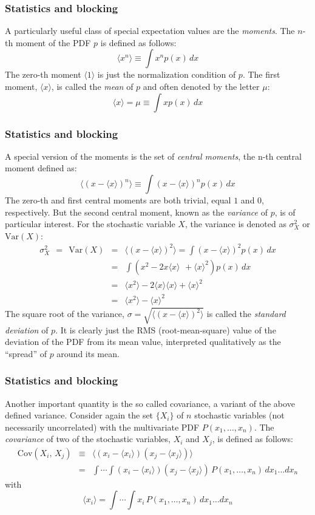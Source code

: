 \documentclass[compress]{beamer}
\newcommand{\bea}{\begin{eqnarray}}
\newcommand{\beaN}{\begin{eqnarray*}}
\newcommand{\eea}{\end{eqnarray}}
\newcommand{\eeaN}{\end{eqnarray*}}
\newcommand{\bdm}{\begin{displaymath}}
\newcommand{\edm}{\end{displaymath}}
\newcommand{\mean}[1]{\langle #1 \rangle}
\newcommand{\meanb}[1]{\big\langle #1 \big\rangle}
\newcommand{\cov}[0]{\mathrm{Cov}}   %
\newcommand{\var}[0]{\mathrm{Var}}   %
\begin{document}
\frame
{
  \frametitle{Statistics and blocking}
\begin{small}
{\scriptsize
A particularly useful class of special expectation values are the
\emph{moments}. The $n$-th moment of the PDF $p$ is defined as
follows:
\bdm
\mean{x^n} \equiv \int\! x^n p(x)\,dx
\edm
The zero-th moment $\mean{1}$ is just the normalization condition of
$p$. The first moment, $\mean{x}$, is called the \emph{mean} of $p$
and often denoted by the letter $\mu$:
\bdm
\mean{x} = \mu \equiv \int\! x p(x)\,dx
\edm
}
\end{small}
}

\frame
{
  \frametitle{Statistics and blocking}
\begin{small}
{\scriptsize
A special version of the moments is the set of \emph{central moments},
the n-th central moment defined as:
\bdm
\mean{(x-\mean{x})^n} \equiv \int\! (x-\mean{x})^n p(x)\,dx
\edm
The zero-th and first central moments are both trivial, equal $1$ and
$0$, respectively. But the second central moment, known as the
\emph{variance} of $p$, is of particular interest. For the stochastic
variable $X$, the variance is denoted as $\sigma^2_X$ or $\var(X)$:
\beaN
\sigma^2_X\ \ =\ \ \var(X) & = & \mean{(x-\mean{x})^2} =
\int\! (x-\mean{x})^2 p(x)\,dx\\
& = & \int\! \left(x^2 - 2 x \mean{x}^{\phantom{2}} +
  \mean{x}^2\right)p(x)\,dx\\
& = & \mean{x^2} - 2 \mean{x}\mean{x} + \mean{x}^2\\
& = & \mean{x^2} - \mean{x}^2
\eeaN
The square root of the variance, $\sigma =
\sqrt{\mean{(x-\mean{x})^2}}$ is called the \emph{standard
  deviation} of $p$. It is clearly just the RMS (root-mean-square)
value of the deviation of the PDF from its mean value, interpreted
qualitatively as the ``spread'' of $p$ around its mean.
}
\end{small}
}


\frame
{
  \frametitle{Statistics and blocking}
\begin{small}
{\scriptsize
Another important quantity is the so called covariance, a variant of
the above defined variance. Consider again the set $\{X_i\}$ of $n$
stochastic variables (not necessarily uncorrelated) with the
multivariate PDF $P(x_1,\dots,x_n)$. The \emph{covariance} of two
of the stochastic variables, $X_i$ and $X_j$, is defined as follows:
\bea
\cov(X_i,\,X_j) &\equiv& \meanb{(x_i-\mean{x_i})(x_j-\mean{x_j})}
\nonumber\\
&=&
\int\!\cdots\!\int\!(x_i-\mean{x_i})(x_j-\mean{x_j})\,
P(x_1,\dots,x_n)\,dx_1\dots dx_n
\label{eq:def_covariance}
\eea
with
\bdm
\mean{x_i} =
\int\!\cdots\!\int\!x_i\,P(x_1,\dots,x_n)\,dx_1\dots dx_n
\edm
}
\end{small}
}
\end{document}
